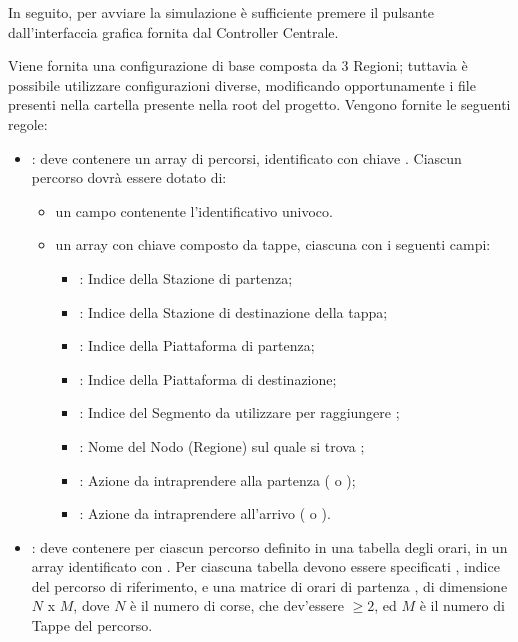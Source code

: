 	In seguito, per avviare la simulazione è sufficiente premere il pulsante  dall'interfaccia grafica fornita dal Controller Centrale.
	 
	Viene fornita una configurazione di base composta da 3 Regioni; tuttavia è possibile utilizzare configurazioni diverse, modificando opportunamente i file  presenti nella cartella  presente nella root del progetto. Vengono fornite le seguenti regole:
	\begin{itemize}
		\item {}: deve contenere un array di percorsi, identificato con chiave . Ciascun percorso dovrà essere dotato di:
			\begin{itemize}
				\item un campo  contenente l'identificativo univoco.
				\item un array con chiave  composto da tappe, ciascuna con i seguenti campi:
					\begin{itemize}
						\item {}: Indice della Stazione di partenza;
						\item {}: Indice della Stazione di destinazione della tappa;
						\item {}: Indice della Piattaforma di partenza;
						\item {}: Indice della Piattaforma di destinazione;
						\item {}: Indice del Segmento da utilizzare per raggiungere ;
						\item {}: Nome del Nodo (Regione) sul quale si trova ;
						\item {}: Azione da intraprendere alla partenza ( o );
						\item {}: Azione da intraprendere all'arrivo ( o ).
					\end{itemize}
			\end{itemize}
		\item {}: deve contenere per ciascun percorso definito in  una tabella degli orari, in un array identificato con . Per ciascuna tabella devono essere specificati , indice del percorso di riferimento, e una matrice di orari di partenza , di dimensione $N$ x $M$, dove $N$ è il numero di corse, che dev'essere $\ge 2$, ed $M$ è il numero di Tappe del percorso.

\end{itemize}
